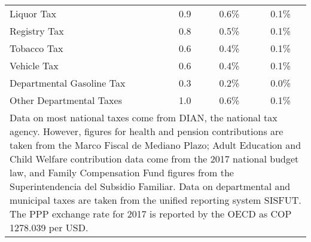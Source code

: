 \documentclass[12pt]{article}
\begin{document}
\begin{table}
\begin{tabular}{lccc}
Liquor Tax                                             & 0.9                           & 0.6\%                    & 0.1\%                    \\
Registry Tax                                            & 0.8                           & 0.5\%                    & 0.1\%                    \\
Tobacco Tax                                             & 0.6                           & 0.4\%                    & 0.1\%                    \\
Vehicle Tax                                             & 0.6                           & 0.4\%                    & 0.1\%                    \\
Departmental Gasoline Tax                               & 0.3                           & 0.2\%                    & 0.0\%                    \\
Other Departmental Taxes                                & 1.0                           & 0.6\%                    & 0.1\%                   \\ \hline
\multicolumn{4}{p{14.5cm}}{Data on most national taxes come from DIAN, the national tax agency.
  However, figures for health and pension contributions are taken from the Marco Fiscal de Mediano Plazo; Adult Education and Child Welfare contribution data come from the 2017 national budget law, and Family Compensation Fund figures from the Superintendencia del Subsidio Familiar.
  Data on departmental and municipal taxes are taken from the unified reporting system SISFUT.
  The PPP exchange rate for 2017 is reported by the OECD as COP 1278.039 per USD.} \\
\end{tabular}
\end{table}
\end{document}
